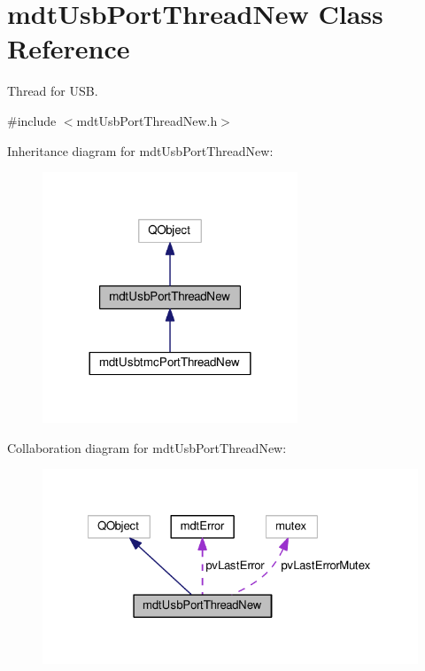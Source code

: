 \hypertarget{classmdt_usb_port_thread_new}{\section{mdt\-Usb\-Port\-Thread\-New Class Reference}
\label{classmdt_usb_port_thread_new}
}


Thread for U\-S\-B.  




{\ttfamily \#include $<$mdt\-Usb\-Port\-Thread\-New.\-h$>$}



Inheritance diagram for mdt\-Usb\-Port\-Thread\-New\-:
\nopagebreak
\begin{figure}[H]
\begin{center}
\leavevmode
\includegraphics[width=216pt]{classmdt_usb_port_thread_new__inherit__graph}
\end{center}
\end{figure}


Collaboration diagram for mdt\-Usb\-Port\-Thread\-New\-:
\nopagebreak
\begin{figure}[H]
\begin{center}
\leavevmode
\includegraphics[width=324pt]{classmdt_usb_port_thread_new__coll__graph}
\end{center}
\end{figure}
